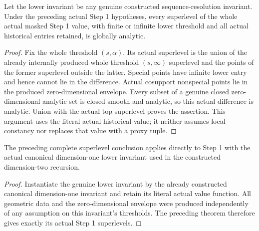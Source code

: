 \begin{theorem}
\label{hir:dimtwo-whole-stepone-superlevels}
\leanok
Let the lower invariant be any genuine constructed sequence-resolution
invariant. Under the preceding actual Step 1 hypotheses, every superlevel
of the whole actual masked Step 1 value, with finite or infinite lower
threshold and all actual historical entries retained, is globally analytic.
\end{theorem}
\begin{proof}
Fix the whole threshold $(s,\alpha)$. Its actual superlevel is the union of
the already internally produced whole threshold $(s,\infty)$ superlevel
and the points of the former superlevel outside the latter. Special points
have infinite lower entry and hence cannot lie in the difference. Actual
cosupport nonspecial points lie in the produced zero-dimensional envelope.
Every subset of a genuine closed zero-dimensional analytic set is closed
smooth and analytic, so this actual difference is analytic. Union with the
actual top superlevel proves the assertion. This argument uses the literal
actual historical value; it neither assumes local constancy nor replaces
that value with a proxy tuple.
\end{proof}

\begin{corollary}
\label{hir:dimtwo-canonical-stepone-superlevels}
\leanok
The preceding complete superlevel conclusion applies directly to Step 1
with the actual canonical dimension-one lower invariant used in the
constructed dimension-two recursion.
\end{corollary}
\begin{proof}
Instantiate the genuine lower invariant by the already constructed canonical
dimension-one invariant and retain its literal actual value function. All
geometric data and the zero-dimensional envelope were produced independently
of any assumption on this invariant's thresholds. The preceding theorem
therefore gives exactly its actual Step 1 superlevels.
\end{proof}
